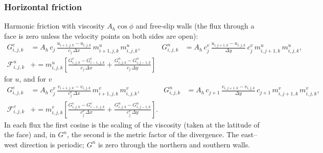 \documentclass{article}
\begin{document}
\subsubsection*{Horizontal friction}
Harmonic friction with viscosity $A_h\cos\phi$ and free-slip walls (the flux through a face is zero unless the velocity points on both sides are open):
\begin{align*}
G^e_{i,j,k} &= A_h\,c_j\,\frac{u_{i+1,j,k} - u_{i,j,k}}{c_j\,\Delta x}\, m^u_{i+1,j,k}\, m^u_{i,j,k},
&
G^n_{i,j,k} &= A_h\,c^v_j\,\frac{u_{i,j+1,k} - u_{i,j,k}}{\Delta y}\, c^v_j\, m^u_{i,j+1,k}\, m^u_{i,j,k}, \\
\mathcal{F}^u_{i,j,k} &\mathrel{+}= m^u_{i,j,k}\left[ \frac{G^e_{i,j,k} - G^e_{i-1,j,k}}{c_j\,\Delta x} + \frac{G^n_{i,j,k} - G^n_{i,j-1,k}}{c_j\,\Delta y} \right]
\end{align*}
for $u$, and for $v$
\begin{align*}
G^e_{i,j,k} &= A_h\,c^v_j\,\frac{v_{i+1,j,k} - v_{i,j,k}}{c^v_j\,\Delta x}\, m^v_{i+1,j,k}\, m^v_{i,j,k},
&
G^n_{i,j,k} &= A_h\,c_{j+1}\,\frac{v_{i,j+1,k} - v_{i,j,k}}{\Delta y}\, c_{j+1}\, m^v_{i,j+1,k}\, m^v_{i,j,k}, \\
\mathcal{F}^v_{i,j,k} &\mathrel{+}= m^v_{i,j,k}\left[ \frac{G^e_{i,j,k} - G^e_{i-1,j,k}}{c^v_j\,\Delta x} + \frac{G^n_{i,j,k} - G^n_{i,j-1,k}}{c^v_j\,\Delta y} \right].
\end{align*}
In each flux the first cosine is the scaling of the viscosity (taken at the latitude of the face) and, in $G^n$, the second is the metric factor of the divergence.
The east--west direction is periodic; $G^n$ is zero through the northern and southern walls.
\end{document}
